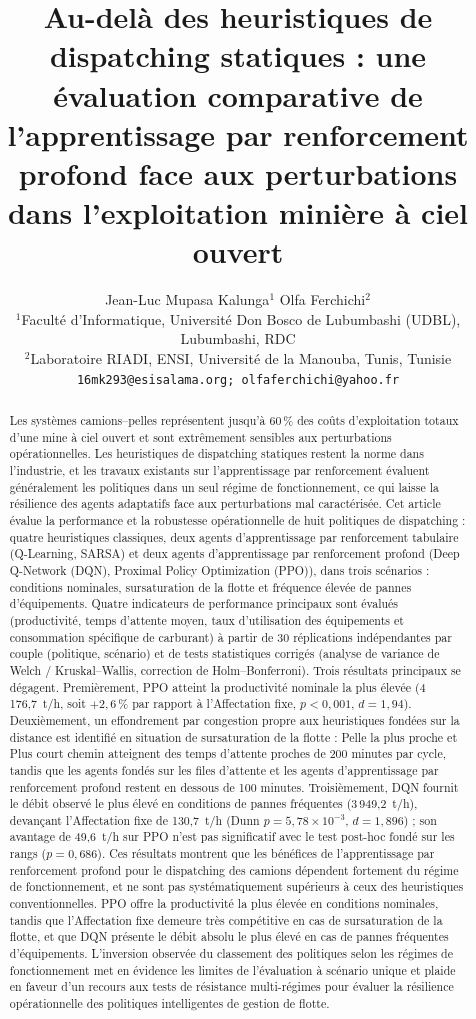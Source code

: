 \documentclass[11pt,a4paper]{article}
\title{\textbf{Au-delà des heuristiques de dispatching statiques : une évaluation comparative de l'apprentissage par renforcement profond face aux perturbations dans l'exploitation minière à ciel ouvert}}
\author{%
\begin{tabular}{c}
Jean-Luc Mupasa Kalunga$^{1}$ \qquad Olfa Ferchichi$^{2}$\\[0.5em]
{\small $^{1}$Faculté d'Informatique, Université Don Bosco de Lubumbashi (UDBL), Lubumbashi, RDC}\\
{\small $^{2}$Laboratoire RIADI, ENSI, Université de la Manouba, Tunis, Tunisie}\\[0.3em]
{\small\texttt{16mk293@esisalama.org; olfaferchichi@yahoo.fr}}
\end{tabular}%
}
\date{} %
\begin{document}
\maketitle

\begin{abstract}
Les systèmes camions--pelles représentent jusqu'à 60\,\% des coûts d'exploitation totaux d'une mine à ciel ouvert
et sont extrêmement sensibles aux perturbations opérationnelles. Les heuristiques de dispatching statiques restent la
norme dans l'industrie, et les travaux existants sur l'apprentissage par renforcement évaluent généralement les politiques
dans un seul régime de fonctionnement, ce qui laisse la résilience des agents adaptatifs face aux perturbations mal
caractérisée. Cet article évalue la performance et la robustesse opérationnelle de huit politiques de dispatching :
quatre heuristiques classiques, deux agents d'apprentissage par renforcement tabulaire (Q-Learning, SARSA) et deux agents
d'apprentissage par renforcement profond (Deep Q-Network (DQN), Proximal Policy Optimization (PPO)), dans trois scénarios :
conditions nominales, sursaturation de la flotte et fréquence élevée de pannes d'équipements. Quatre indicateurs de
performance principaux sont évalués (productivité, temps d'attente moyen, taux d'utilisation des équipements et consommation
spécifique de carburant) à partir de 30 réplications indépendantes par couple (politique, scénario) et de tests statistiques
corrigés (analyse de variance de Welch / Kruskal--Wallis, correction de Holm--Bonferroni). Trois résultats principaux
se dégagent. Premièrement, PPO atteint la productivité nominale la plus élevée (4\,176,7~t/h, soit $+2{,}6\,\%$ par rapport à l'Affectation fixe,
$p < 0{,}001$, $d=1{,}94$). Deuxièmement, un effondrement par congestion propre aux heuristiques fondées sur la distance est
identifié en situation de sursaturation de la flotte : Pelle la plus proche et Plus court chemin atteignent des temps d'attente proches de 200 minutes par cycle, tandis que
les agents fondés sur les files d'attente et les agents d'apprentissage par renforcement profond restent en dessous de 100 minutes. Troisièmement, DQN
fournit le débit observé le plus élevé en conditions de pannes fréquentes (3\,949,2~t/h), devançant l'Affectation fixe de 130,7~t/h (Dunn $p=5{,}78\times10^{-3}$, $d=1{,}896$) ; son avantage de 49,6~t/h sur PPO n'est pas significatif avec le test post-hoc fondé sur les rangs ($p=0{,}686$). Ces résultats montrent que les bénéfices de l'apprentissage par renforcement profond pour le dispatching des camions
dépendent fortement du régime de fonctionnement, et ne sont pas systématiquement supérieurs à ceux des heuristiques conventionnelles.
PPO offre la productivité la plus élevée en conditions nominales, tandis que l'Affectation fixe demeure très compétitive
en cas de sursaturation de la flotte, et que DQN présente le débit absolu le plus élevé en cas de pannes fréquentes d'équipements.
L'inversion observée du classement des politiques selon les régimes de fonctionnement met en évidence les limites de l'évaluation
à scénario unique et plaide en faveur d'un recours aux tests de résistance multi-régimes pour évaluer la résilience opérationnelle
des politiques intelligentes de gestion de flotte.
\end{abstract}
\end{document}
